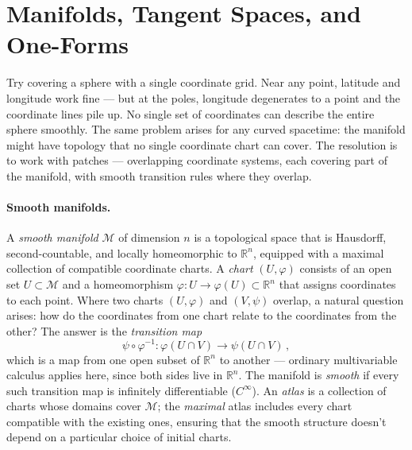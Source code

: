 \section{Manifolds, Tangent Spaces, and One-Forms}
\label{sec:dg-manifolds}

Try covering a sphere with a single coordinate grid.  Near any point, latitude
and longitude work fine --- but at the poles, longitude degenerates to a point and
the coordinate lines pile up.  No single set of coordinates can describe the
entire sphere smoothly.  The same problem arises for any curved spacetime: the
manifold might have topology that no single coordinate chart can cover.  The
resolution is to work with patches --- overlapping coordinate systems, each
covering part of the manifold, with smooth transition rules where they overlap.

\paragraph{Smooth manifolds.}

A \emph{smooth manifold} $\mathcal{M}$ of dimension $n$ is a topological space
that is Hausdorff, second-countable, and locally homeomorphic to
$\mathbb{R}^n$, equipped with a maximal collection of compatible coordinate
charts.  A \emph{chart} $(U, \varphi)$ consists of an open set $U \subset
\mathcal{M}$ and a homeomorphism $\varphi : U \to \varphi(U) \subset
\mathbb{R}^n$ that assigns coordinates to each point.  Where two charts
$(U, \varphi)$ and $(V, \psi)$ overlap, a natural question arises: how do the
coordinates from one chart relate to the coordinates from the other?  The answer
is the \emph{transition map}
%
\begin{equation}
  \psi \circ \varphi^{-1} : \varphi(U \cap V) \to \psi(U \cap V) \,,
  \label{eq:transition-map}
\end{equation}
%
which is a map from one open subset of $\mathbb{R}^n$ to another --- ordinary
multivariable calculus applies here, since both sides live in $\mathbb{R}^n$.
The manifold is \emph{smooth} if every such transition map is infinitely
differentiable ($C^\infty$).  An \emph{atlas} is a collection of charts whose
domains cover $\mathcal{M}$; the \emph{maximal} atlas includes every chart
compatible with the existing ones, ensuring that the smooth structure doesn't
depend on a particular choice of initial charts.

